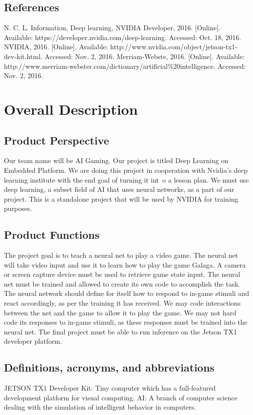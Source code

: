 \documentclass{scrreprt}
\begin{document}
\section{References}
N. C. L. Information, Deep learning, NVIDIA Developer, 2016. [Online]. Available: https://developer.nvidia.com/deep-learning. Accessed: Oct. 18, 2016.
NVIDIA, 2016. [Online]. Available: http://www.nvidia.com/object/jetson-tx1-dev-kit.html. Accessed: Nov. 2, 2016.
Merriam-Webste, 2016. [Online]. Available: http://www.merriam-webster.com/dictionary/artificial\%20intelligence. Accessed: Nov. 2, 2016.

\chapter{Overall Description}

\section{Product Perspective}
Our team name will be AI Gaming.
Our project is titled Deep Learning on Embedded Platform.
We are doing this project in cooperation with Nvidia's deep learning institute with the end goal of turning it int\
o a lesson plan.
We must use deep learning, a subset field of AI that uses neural networks, as a part of our project. This is a standalone project that will be used by NVIDIA for training purposes.

\section{Product Functions}
The project goal is to teach a neural net to play a video game.
The neural net will take video input and use it to learn how to play the game Galaga.
A camera or screen capture device must be used to retrieve game state input.
The neural net must be trained and allowed to create its own code to accomplish the task.
The neural network should define for itself how to respond to in-game stimuli and react accordingly, as per the training it has received.
We may code interactions between the net and the game to allow it to play the game.
We may not hard code its responses to in-game stimuli, as these responses must be trained into the neural net.
The final project must be able to run inference on the Jetson TX1 developer platform.

\section{Definitions, acronyms, and abbreviations}
JETSON TX1 Developer Kit: Tiny computer which has a full-featured development platform for visual computing.
AI: A branch of computer science dealing with the simulation of intelligent behavior in computers.
\end{document}

